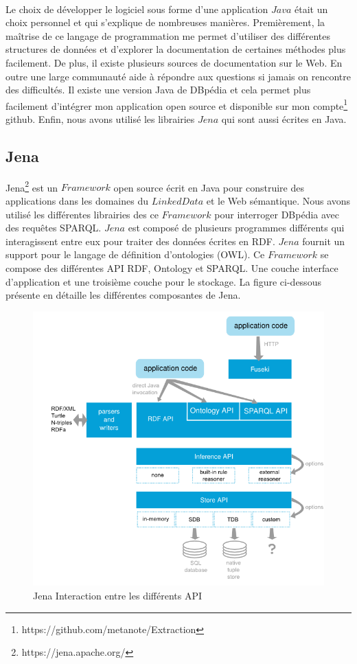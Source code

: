 \documentclass[12pt,a4	]{report}
\begin{document}
\paragraph{}
Le choix de développer le logiciel sous forme d'une application $Java$ était un choix personnel et qui s'explique de nombreuses manières. Premièrement, la maîtrise de ce langage de programmation me permet d'utiliser des différentes structures de données et d'explorer la documentation de certaines méthodes plus facilement. De plus, il existe plusieurs sources de documentation sur le Web. En outre une large communauté aide à répondre aux questions si jamais on rencontre des difficultés. Il existe une version Java de DBpédia et cela permet plus facilement d'intégrer mon application open source et disponible sur mon compte\footnote{https://github.com/metanote/Extraction} github. Enfin, nous avons utilisé les librairies $Jena$ qui sont aussi écrites en Java. 
\subsection{Jena}
Jena\footnote{https://jena.apache.org/} est un $Framework$ open source écrit en Java pour construire des applications dans les domaines du
$LinkedData$ et le Web sémantique. Nous avons utilisé les différentes librairies des ce $Framework$ pour interroger DBpédia avec des requêtes SPARQL. $Jena$ est composé de plusieurs programmes différents qui interagissent entre eux pour traiter des données écrites en RDF. $Jena$ fournit un support pour le langage de définition d'ontologies (OWL). Ce $Framework$ se compose des différentes API RDF, Ontology et SPARQL. Une couche interface d'application et une troisième couche pour le stockage. La figure ci-dessous présente en détaille les différentes composantes de Jena.
 \begin{figure}[H]
        \centering
                \includegraphics[width=12cm]{Jena.png}
               \caption{Jena Interaction entre les différents API}
\end{figure}
\end{document}
